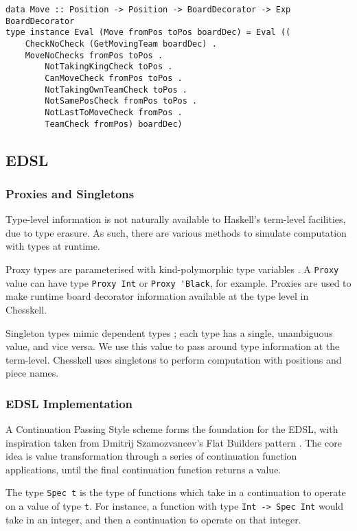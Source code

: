 \documentclass[12pt, a4paper, bibliography=totocnumbered]{scrartcl}
\begin{document}
\begin{lstlisting}
data Move :: Position -> Position -> BoardDecorator -> Exp BoardDecorator
type instance Eval (Move fromPos toPos boardDec) = Eval ((
    CheckNoCheck (GetMovingTeam boardDec) .
    MoveNoChecks fromPos toPos .
        NotTakingKingCheck toPos .
        CanMoveCheck fromPos toPos .
        NotTakingOwnTeamCheck toPos .
        NotSamePosCheck fromPos toPos .
        NotLastToMoveCheck fromPos .
        TeamCheck fromPos) boardDec)
\end{lstlisting}

\subsection{EDSL}

\subsubsection{Proxies and Singletons}

Type-level information is not naturally available to Haskell's term-level facilities, due to type erasure. As such, there are various methods to simulate computation with types at runtime.

Proxy types are parameterised with kind-polymorphic type variables \cite{yorgey2012giving}. A \lstinline{Proxy} value can have type \lstinline{Proxy Int} or \lstinline{Proxy 'Black}, for example. Proxies are used to make runtime board decorator information available at the type level in Chesskell.

Singleton types mimic dependent types \cite{singletons}; each type has a single, unambiguous value, and vice versa. We use this value to pass around type information at the term-level. Chesskell uses singletons to perform computation with positions and piece names.

\subsubsection{EDSL Implementation}

A Continuation Passing Style \cite{cps} scheme forms the foundation for the EDSL, with inspiration taken from Dmitrij Szamozvancev's Flat Builders pattern \cite{mezzo}. The core idea is value transformation through a series of continuation function applications, until the final continuation function returns a value.

The type \lstinline{Spec t} is the type of functions which take in a continuation to operate on a value of type \lstinline{t}. For instance, a function with type \lstinline{Int -> Spec Int} would take in an integer, and then a continuation to operate on that integer.
\end{document}
